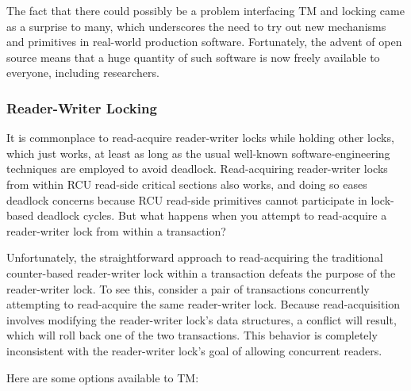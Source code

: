The fact that there could possibly be a problem interfacing TM and locking
came as a surprise to many, which underscores the need to try out new
mechanisms and primitives in real-world production software.
Fortunately, the advent of open source means that a huge quantity of
such software is now freely available to everyone, including researchers.

\subsubsection{Reader-Writer Locking}
\label{sec:future:Reader-Writer Locking}

It is commonplace to read-acquire reader-writer locks while holding
other locks, which just works, at least as long as the usual well-known
software-engineering techniques are employed to avoid deadlock.
Read-acquiring reader-writer locks from within RCU read-side critical
sections also works, and doing so eases deadlock concerns because RCU
read-side primitives cannot participate in lock-based deadlock cycles.
But what happens when you attempt to read-acquire a reader-writer lock
from within a transaction?

Unfortunately, the straightforward approach to read-acquiring the
traditional counter-based reader-writer lock within a transaction defeats
the purpose of the reader-writer lock.
To see this, consider a pair of transactions concurrently attempting to
read-acquire the same reader-writer lock.
Because read-acquisition involves modifying the reader-writer lock's
data structures, a conflict will result, which will roll back one of
the two transactions.
This behavior is completely inconsistent with the reader-writer lock's
goal of allowing concurrent readers.

Here are some options available to TM:

